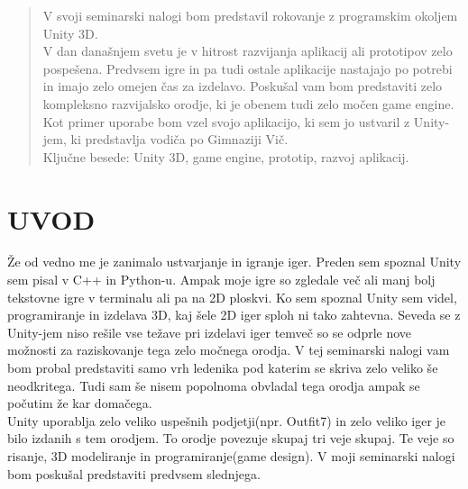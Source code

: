\documentclass[a4paper,oneside,12pt]{article} %
\begin{document}

	\newpage %
	\tableofcontents

	\listoffigures
	
	\newpage

	\begin{abstract}
		V svoji seminarski nalogi bom predstavil rokovanje z programskim okoljem Unity 3D.\\
		V dan današnjem svetu je v hitrost razvijanja aplikacij ali prototipov zelo pospešena. Predvsem igre in pa tudi ostale aplikacije nastajajo po potrebi in imajo zelo omejen čas za izdelavo. Poskušal vam bom predstaviti zelo kompleksno razvijalsko orodje, ki je obenem tudi zelo močen game engine. Kot primer uporabe bom vzel svojo aplikacijo, ki sem jo ustvaril z Unity-jem, ki predstavlja vodiča po Gimnaziji Vič.\\

		Ključne besede: Unity 3D, game engine, prototip, razvoj aplikacij.
	\end{abstract}
	
	\newpage

	{\color{internationalorange}\section*{UVOD}}
	Že od vedno me je zanimalo ustvarjanje in igranje iger. Preden sem spoznal Unity sem pisal v C++ in Python-u. Ampak moje igre so zgledale več ali manj bolj tekstovne igre v terminalu ali pa na 2D ploskvi. Ko sem spoznal Unity sem videl, programiranje in izdelava 3D, kaj šele 2D iger sploh ni tako zahtevna. Seveda se z Unity-jem niso rešile vse težave pri izdelavi iger temveč so se odprle nove možnosti za raziskovanje tega zelo močnega orodja. V tej seminarski nalogi vam bom probal predstaviti samo vrh ledenika pod katerim se skriva zelo veliko še neodkritega. Tudi sam še nisem popolnoma obvladal tega orodja ampak se počutim že kar domačega.\\
	Unity uporablja zelo veliko uspešnih podjetji(npr. Outfit7) in zelo veliko iger je bilo izdanih s tem orodjem. To orodje povezuje skupaj tri veje skupaj. Te veje so risanje, 3D modeliranje in programiranje(game design). V moji seminarski nalogi bom poskušal predstaviti predvsem slednjega. 


	\newpage	
\end{document}
